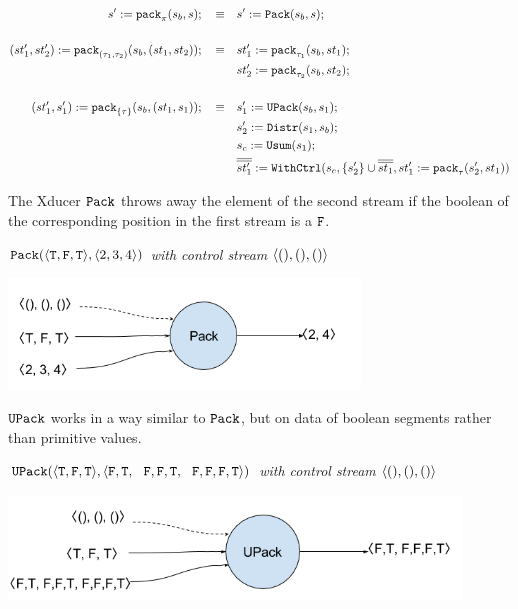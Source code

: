 \begin{align*}
s' := \Pack{s_b}{s}{\pi}; \quad \equiv & \quad s' := \packf{s_b}{s}; \\
\\
(st'_1,st'_2)  := \Pack{s_b}{(st_1,st_2)}{(\tau_1,\tau_2)}; \quad \equiv & \quad st_1' := \Pack{s_b}{st_1}{\tau_1}; \\ 
&\quad st_2' := \Pack{s_b}{st_2}{\tau_2};\\
\\
(st'_1,s_1')  := \Pack{s_b}{(st_1,s_1)}{\{\tau\}}; \quad \equiv & \quad s_1' := \upackf{s_b}{s_1}; \\ 
&\quad s_2' := \distrf{s_1}{s_b};\\
&\quad s_c := \usumf{s_1}; \\
&\quad \withctrl{s_c}{st_1' :=  \Pack{s_2'}{st_1}{\tau}}{\{s_2'\} \cup \olol{st_1}}{\olol{st'_1}} \\
\end{align*}



The Xducer $\pack$ throws away the element of the second stream if the boolean of the corresponding position in the first stream is a $\F$. 

\begin{example} \emph{$\pack({\<\T,\F,\T\'>}, \<2,3,4 \'>)$ with control stream $\< (),(), () \'>$}\\
	\begin{center}
		\includegraphics[width=0.7\textwidth]{fig/packxducer.png}
	\end{center}
\end{example}

$\upack$ works in a way similar to $\pack$, but on data of boolean segments rather than primitive values.
\begin{example} \emph{$\upack({\<\T,\F,\T\'>}, \< \F,\T,\ \ \F,\F,\T, \ \ \F,\F,\F, \T\'>)$ with control stream $\< (),(), () \'>$}\\
	\begin{center}
		\includegraphics[width=0.9\textwidth]{fig/upackxducer.png}
	\end{center}
\end{example}


